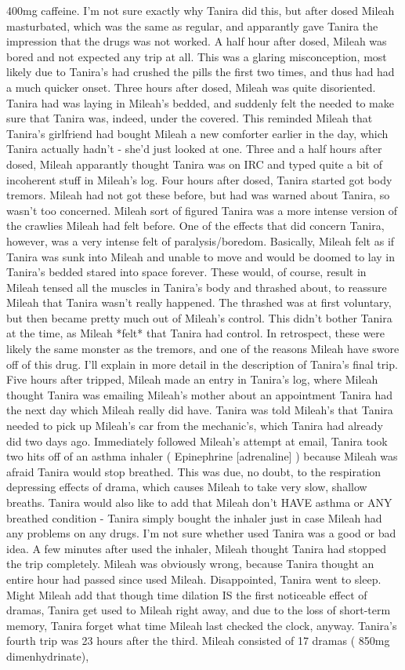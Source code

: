 \documentclass[12pt]{book}
\begin{document}
400mg caffeine. I'm not sure exactly why Tanira did this, but after dosed Mileah masturbated, which was the same as regular, and apparantly gave Tanira the impression that the drugs was not worked. A half hour after dosed, Mileah was bored and not expected any trip at all. This was a glaring misconception, most likely due to Tanira's had crushed the pills the first two times, and thus had had a much quicker onset. Three hours after dosed, Mileah was quite disoriented. Tanira had was laying in Mileah's bedded, and suddenly felt the needed to make sure that Tanira was, indeed, under the covered. This reminded Mileah that Tanira's girlfriend had bought Mileah a new comforter earlier in the day, which Tanira actually hadn't - she'd just looked at one. Three and a half hours after dosed, Mileah apparantly thought Tanira was on IRC and typed quite a bit of incoherent stuff in Mileah's log. Four hours after dosed, Tanira started got body tremors. Mileah had not got these before, but had was warned about Tanira, so wasn't too concerned. Mileah sort of figured Tanira was a more intense version of the crawlies Mileah had felt before. One of the effects that did concern Tanira, however, was a very intense felt of paralysis/boredom. Basically, Mileah felt as if Tanira was sunk into Mileah and unable to move and would be doomed to lay in Tanira's bedded stared into space forever. These would, of course, result in Mileah tensed all the muscles in Tanira's body and thrashed about, to reassure Mileah that Tanira wasn't really happened. The thrashed was at first voluntary, but then became pretty much out of Mileah's control. This didn't bother Tanira at the time, as Mileah *felt* that Tanira had control. In retrospect, these were likely the same monster as the tremors, and one of the reasons Mileah have swore off of this drug. I'll explain in more detail in the description of Tanira's final trip. Five hours after tripped, Mileah made an entry in Tanira's log, where Mileah thought Tanira was emailing Mileah's mother about an appointment Tanira had the next day which Mileah really did have. Tanira was told Mileah's that Tanira needed to pick up Mileah's car from the mechanic's, which Tanira had already did two days ago. Immediately followed Mileah's attempt at email, Tanira took two hits off of an asthma inhaler ( Epinephrine [adrenaline] ) because Mileah was afraid Tanira would stop breathed. This was due, no doubt, to the respiration depressing effects of drama, which causes Mileah to take very slow, shallow breaths. Tanira would also like to add that Mileah don't HAVE asthma or ANY breathed condition - Tanira simply bought the inhaler just in case Mileah had any problems on any drugs. I'm not sure whether used Tanira was a good or bad idea. A few minutes after used the inhaler, Mileah thought Tanira had stopped the trip completely. Mileah was obviously wrong, because Tanira thought an entire hour had passed since used Mileah. Disappointed, Tanira went to sleep. Might Mileah add that though time dilation IS the first noticeable effect of dramas, Tanira get used to Mileah right away, and due to the loss of short-term memory, Tanira forget what time Mileah last checked the clock, anyway. Tanira's fourth trip was 23 hours after the third. Mileah consisted of 17 dramas ( 850mg dimenhydrinate), 
\end{document}

